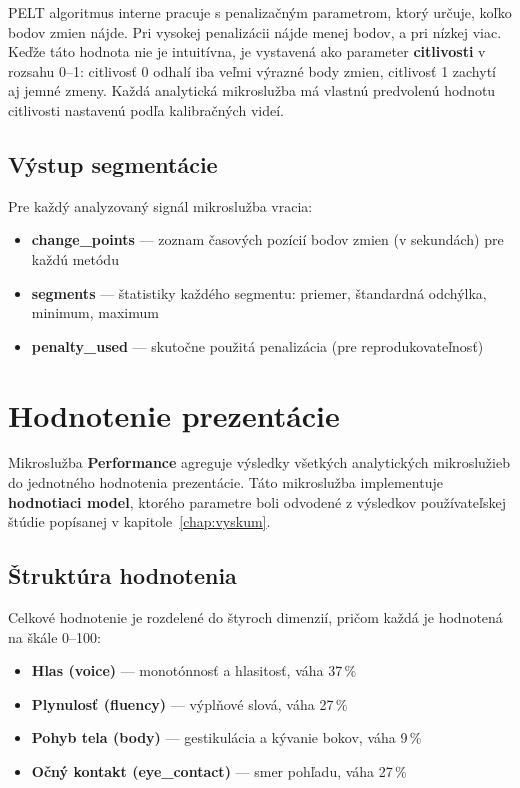 PELT algoritmus interne pracuje s penalizačným parametrom, ktorý určuje, koľko bodov zmien nájde. Pri vysokej penalizácii nájde menej bodov, a pri nízkej viac.
Keďže táto hodnota nie je intuitívna, je vystavená ako parameter \textbf{citlivosti} v rozsahu 0--1: citlivosť 0 odhalí iba veľmi výrazné body zmien, citlivosť 1 zachytí aj jemné zmeny.
Každá analytická mikroslužba má vlastnú predvolenú hodnotu citlivosti nastavenú podľa kalibračných videí.

\subsection{Výstup segmentácie}

Pre každý analyzovaný signál mikroslužba vracia:
\begin{itemize}
    \item \textbf{change\_points} --- zoznam časových pozícií bodov zmien (v sekundách) pre každú metódu
    \item \textbf{segments} --- štatistiky každého segmentu: priemer, štandardná odchýlka, minimum, maximum
    \item \textbf{penalty\_used} --- skutočne použitá penalizácia (pre reprodukovateľnosť)
\end{itemize}

\section{Hodnotenie prezentácie}

Mikroslužba \textbf{Performance} agreguje výsledky všetkých analytických mikroslužieb do jednotného hodnotenia prezentácie.
Táto mikroslužba implementuje \textbf{hodnotiaci model}, ktorého parametre boli odvodené z výsledkov používateľskej štúdie popísanej v kapitole~\ref{chap:vyskum}.

\subsection{Štruktúra hodnotenia}

Celkové hodnotenie je rozdelené do štyroch dimenzií, pričom každá je hodnotená na škále 0--100:

\begin{itemize}
    \item \textbf{Hlas (voice)} --- monotónnosť a hlasitosť, váha 37\,\%
    \item \textbf{Plynulosť (fluency)} --- výplňové slová, váha 27\,\%
    \item \textbf{Pohyb tela (body)} --- gestikulácia a kývanie bokov, váha 9\,\%
    \item \textbf{Očný kontakt (eye\_contact)} --- smer pohľadu, váha 27\,\%
\end{itemize}

